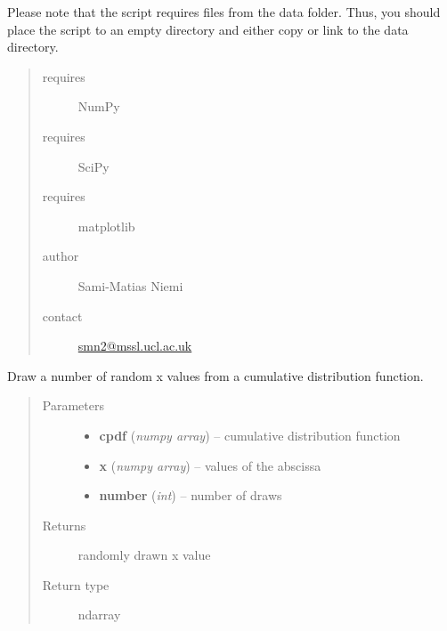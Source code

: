 \documentclass[a4paper,12pt,english]{sphinxmanual}
\begin{document}
Please note that the script requires files from the data folder. Thus, you should
place the script to an empty directory and either copy or link to the data directory.
\begin{quote}\begin{description}
\item[{requires}] \leavevmode
NumPy

\item[{requires}] \leavevmode
SciPy

\item[{requires}] \leavevmode
matplotlib

\item[{author}] \leavevmode
Sami-Matias Niemi

\item[{contact}] \leavevmode
\href{mailto:smn2@mssl.ucl.ac.uk}{smn2@mssl.ucl.ac.uk}

\end{description}\end{quote}

\begin{fulllineitems}
\label{sources:sources.createObjectCatalogue.drawFromCumulativeDistributionFunction}
Draw a number of random x values from a cumulative distribution function.
\begin{quote}\begin{description}
\item[{Parameters}] \leavevmode\begin{itemize}
\item {} 
\textbf{cpdf} (\emph{numpy array}) -- cumulative distribution function

\item {} 
\textbf{x} (\emph{numpy array}) -- values of the abscissa

\item {} 
\textbf{number} (\emph{int}) -- number of draws

\end{itemize}

\item[{Returns}] \leavevmode
randomly drawn x value

\item[{Return type}] \leavevmode
ndarray

\end{description}\end{quote}

\end{fulllineitems}
\end{document}
